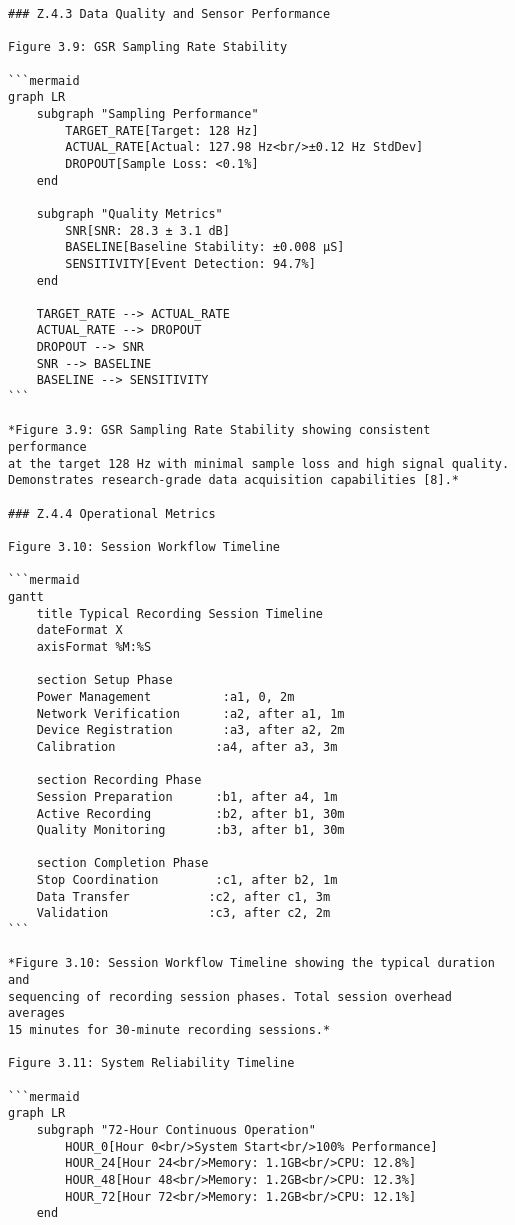 \begin{verbatim}
### Z.4.3 Data Quality and Sensor Performance

Figure 3.9: GSR Sampling Rate Stability

```mermaid
graph LR
    subgraph "Sampling Performance"
        TARGET_RATE[Target: 128 Hz]
        ACTUAL_RATE[Actual: 127.98 Hz<br/>±0.12 Hz StdDev]
        DROPOUT[Sample Loss: <0.1%]
    end

    subgraph "Quality Metrics"
        SNR[SNR: 28.3 ± 3.1 dB]
        BASELINE[Baseline Stability: ±0.008 μS]
        SENSITIVITY[Event Detection: 94.7%]
    end

    TARGET_RATE --> ACTUAL_RATE
    ACTUAL_RATE --> DROPOUT
    DROPOUT --> SNR
    SNR --> BASELINE
    BASELINE --> SENSITIVITY
```

*Figure 3.9: GSR Sampling Rate Stability showing consistent performance
at the target 128 Hz with minimal sample loss and high signal quality.
Demonstrates research-grade data acquisition capabilities [8].*

### Z.4.4 Operational Metrics

Figure 3.10: Session Workflow Timeline

```mermaid
gantt
    title Typical Recording Session Timeline
    dateFormat X
    axisFormat %M:%S

    section Setup Phase
    Power Management          :a1, 0, 2m
    Network Verification      :a2, after a1, 1m
    Device Registration       :a3, after a2, 2m
    Calibration              :a4, after a3, 3m

    section Recording Phase
    Session Preparation      :b1, after a4, 1m
    Active Recording         :b2, after b1, 30m
    Quality Monitoring       :b3, after b1, 30m

    section Completion Phase
    Stop Coordination        :c1, after b2, 1m
    Data Transfer           :c2, after c1, 3m
    Validation              :c3, after c2, 2m
```

*Figure 3.10: Session Workflow Timeline showing the typical duration and
sequencing of recording session phases. Total session overhead averages
15 minutes for 30-minute recording sessions.*

Figure 3.11: System Reliability Timeline

```mermaid
graph LR
    subgraph "72-Hour Continuous Operation"
        HOUR_0[Hour 0<br/>System Start<br/>100% Performance]
        HOUR_24[Hour 24<br/>Memory: 1.1GB<br/>CPU: 12.8%]
        HOUR_48[Hour 48<br/>Memory: 1.2GB<br/>CPU: 12.3%]
        HOUR_72[Hour 72<br/>Memory: 1.2GB<br/>CPU: 12.1%]
    end


\end{verbatim}

